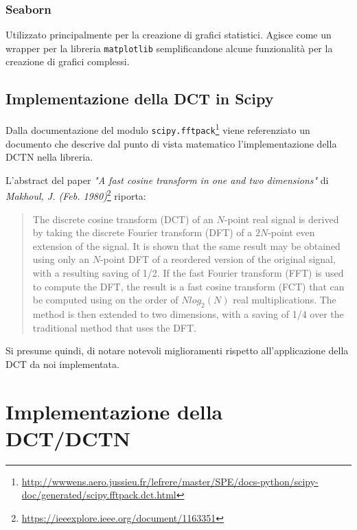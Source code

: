 \documentclass[11pt,italian]{article}
\begin{document}
\subsubsection*{Seaborn}
Utilizzato principalmente per la creazione di grafici statistici. Agisce come un wrapper per la libreria \lstinline{matplotlib} semplificandone alcune funzionalità per la creazione di grafici complessi.

\subsection{Implementazione della DCT in Scipy}
\label{section:scipy-fft}
Dalla documentazione del modulo \lstinline{scipy.fftpack}\footnote{\url{http://wwwens.aero.jussieu.fr/lefrere/master/SPE/docs-python/scipy-doc/generated/scipy.fftpack.dct.html}} viene referenziato un documento che descrive dal punto di vista matematico l'implementazione della DCTN nella libreria.

\noindent
L'abstract del paper \textit{"A fast cosine transform in one and two dimensions"} di \textit{Makhoul, J. (Feb. 1980)}\footnote{\url{https://ieeexplore.ieee.org/document/1163351}} riporta:
\begin{quote}
    The discrete cosine transform (DCT) of an $N$-point real signal is derived by taking the discrete Fourier transform (DFT) of a $2N$-point even extension of the signal.
    It is shown that the same result may be obtained using only an $N$-point DFT of a reordered version of the original signal, with a resulting saving of 1/2.
    If the fast Fourier transform (FFT) is used to compute the DFT, the result is a fast cosine transform (FCT) that can be computed using on the order of $N log_2(N)$ real multiplications.
    The method is then extended to two dimensions, with a saving of 1/4 over the traditional method that uses the DFT.
\end{quote}

\noindent
Si presume quindi, di notare notevoli miglioramenti rispetto all'applicazione della DCT da noi implementata.

\newpage
\section{Implementazione della DCT/DCTN}
\end{document}
